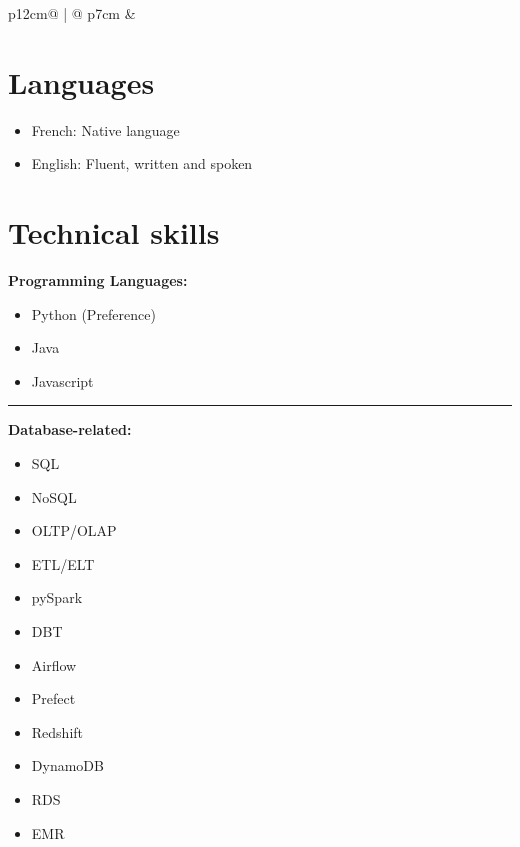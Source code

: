 \documentclass[letterpaper, 11pt]{article}
\begin{document}
\begin{tabular}{p{12cm}@{\hspace{1em}} | @{\hspace{1em}} p{7cm}}
    & %
    
    \section*{Languages}
        \begin{itemize}
            \item French: Native language
            \item English: Fluent, written and spoken
        \end{itemize}
        \vspace{10pt}
    \section*{Technical skills}
        {\large\textbf{Programming Languages:}}
        \begin{itemize}    
            \item Python (Preference)
            \item Java
            \item Javascript
        \end{itemize}
        
        \begin{adjustwidth}{2em}{2em}
                {\color{lightgray}\rule{\linewidth}{1pt}}           
        \end{adjustwidth}
        
        \vspace{3pt}
        {\large\textbf{Database-related:}}
            \begin{multicols}{2}
                \begin{itemize}
                    \item SQL
                    \item NoSQL
                    \item OLTP/OLAP
                    \item ETL/ELT
                    \item pySpark
                    \item DBT
                    \item Airflow
                    \item Prefect
                    \item Redshift    
                    \item DynamoDB
                    \item RDS
                    \item EMR
                \end{itemize}
            \end{multicols}
            

\end{tabular}
\end{document}
